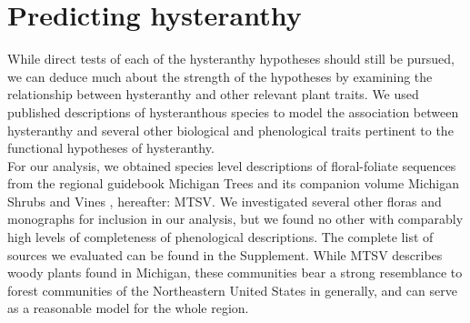 \documentclass{article}\usepackage[]{graphicx}\usepackage[]{color}
\begin{document}
\section*{Predicting hysteranthy}
\indent While direct tests of each of the hysteranthy hypotheses should still be pursued, we can deduce much about the strength of the hypotheses by examining the relationship between hysteranthy and other relevant plant traits. We used published descriptions of hysteranthous species to model the association between hysteranthy and several other biological and phenological traits pertinent to the functional hypotheses of hysteranthy.\\
\indent For our analysis, we obtained species level descriptions of floral-foliate sequences from the regional guidebook Michigan Trees \citep{Barnes2004} and its companion volume Michigan Shrubs and Vines \citep{Barnes2016}, hereafter: MTSV. We investigated several other floras and monographs for inclusion in our analysis, but we found no other with comparably high levels of completeness of phenological descriptions. The complete list of sources we evaluated can be found in the Supplement. While MTSV describes woody plants found in Michigan, these communities bear a strong resemblance to forest communities of the Northeastern United States in generally, and can serve as a reasonable model for the whole region. \\
\end{document}
